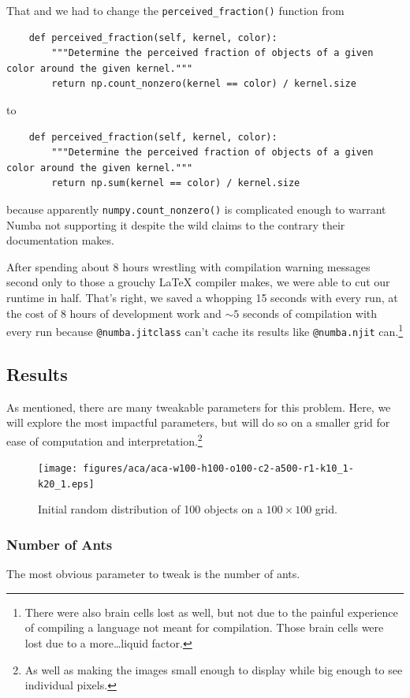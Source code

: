 \documentclass[12pt]{article}
\begin{document}
That and we had to change the \texttt{perceived_fraction()} function from
\begin{verbatim}
    def perceived_fraction(self, kernel, color):
        """Determine the perceived fraction of objects of a given color around the given kernel."""
        return np.count_nonzero(kernel == color) / kernel.size
\end{verbatim}
to
\begin{verbatim}
    def perceived_fraction(self, kernel, color):
        """Determine the perceived fraction of objects of a given color around the given kernel."""
        return np.sum(kernel == color) / kernel.size
\end{verbatim}
because apparently \texttt{numpy.count_nonzero()} is complicated enough to warrant Numba not supporting it despite the wild claims to the contrary their documentation makes.

After spending about 8 hours wrestling with compilation warning messages second only to those a grouchy \LaTeX{} compiler makes, we were able to cut our runtime in half.
That's right, we saved a whopping 15 seconds with every run, at the cost of 8 hours of development work and $\sim 5$ seconds of compilation with every run because \texttt{@numba.jitclass} can't cache its results like \texttt{@numba.njit} can.\footnote{There were also brain cells lost as well, but not due to the painful experience of compiling a language not meant for compilation. Those brain cells were lost due to a more\dots liquid factor.}

\subsection{Results}
As mentioned, there are many tweakable parameters for this problem. Here, we will explore the most impactful parameters, but will do so on a smaller grid for ease of computation and interpretation.\footnote{As well as making the images small enough to display while big enough to see individual pixels.}

\begin{figure}[H]
    \centering
    \texttt{[image: figures/aca/aca-w100-h100-o100-c2-a500-r1-k10\_1-k20\_1.eps]}
    \caption{Initial random distribution of 100 objects on a $100 \times 100$ grid.}\label{fig:aca:rand-objects}
\end{figure}

\subsubsection{Number of Ants}
The most obvious parameter to tweak is the number of ants.
\end{document}
